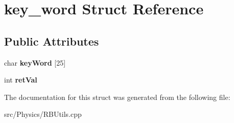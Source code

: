 \hypertarget{structkey__word}{
\section{key\_\-word Struct Reference}
\label{structkey__word}
}
\subsection*{Public Attributes}
\begin{DoxyCompactItemize}
\item 
\hypertarget{structkey__word_a969ae4b43a66df237496ab4432a0373f}{
char {\bfseries keyWord} \mbox{[}25\mbox{]}}
\label{structkey__word_a969ae4b43a66df237496ab4432a0373f}

\item 
\hypertarget{structkey__word_ad5e0d3851ade5d515bbf37a0737c85b1}{
int {\bfseries retVal}}
\label{structkey__word_ad5e0d3851ade5d515bbf37a0737c85b1}

\end{DoxyCompactItemize}


The documentation for this struct was generated from the following file:\begin{DoxyCompactItemize}
\item 
src/Physics/RBUtils.cpp\end{DoxyCompactItemize}

